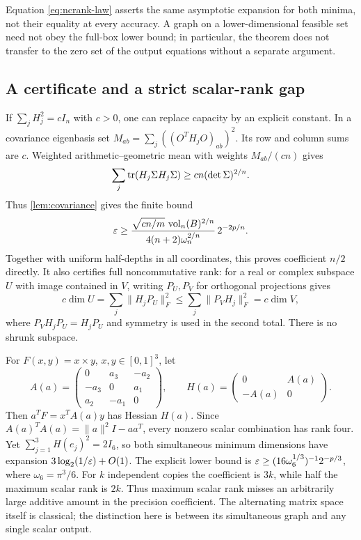 Equation \eqref{eq:ncrank-law} asserts the same asymptotic expansion for
both minima, not their equality at every accuracy. A graph on a
lower-dimensional feasible set need not obey the full-box lower bound;
in particular, the theorem does not transfer to the zero set of the
output equations without a separate argument.

\subsection{A certificate and a strict scalar-rank gap}

If $\sum_jH_j^2=cI_n$ with $c>0$, one can replace capacity by an explicit
constant. In a covariance eigenbasis set
$M_{ab}=\sum_j((O^TH_jO)_{ab})^2$. Its row and column sums are $c$.
Weighted arithmetic--geometric mean with weights $M_{ab}/(cn)$ gives
\[
 \sum_j\operatorname{tr}(H_j\Sigma H_j\Sigma)
 \ge cn(\det\Sigma)^{2/n}.
\]
Thus \cref{lem:covariance} gives the finite bound
\begin{equation}\label{eq:sos-certificate}
 \varepsilon\ge
 \frac{\sqrt{cn/m}\,\operatorname{vol}_n(B)^{2/n}}
      {4(n+2)\omega_n^{2/n}}\,2^{-2p/n}.
\end{equation}
Together with uniform half-depths in all coordinates, this proves
coefficient $n/2$ directly. It also certifies full noncommutative rank:
for a real or complex subspace $U$ with image contained in $V$, writing
$P_U,P_V$ for orthogonal projections gives
\[
 c\dim U=\sum_j\|H_jP_U\|_F^2
 \le\sum_j\|P_VH_j\|_F^2=c\dim V,
\]
where $P_VH_jP_U=H_jP_U$ and symmetry is used in the second total.
There is no shrunk subspace.

For $F(x,y)=x\times y$, $x,y\in[0,1]^3$, let
\[
 A(a)=\begin{pmatrix}0&a_3&-a_2\\-a_3&0&a_1\\a_2&-a_1&0\end{pmatrix},
 \qquad H(a)=\begin{pmatrix}0&A(a)\\-A(a)&0\end{pmatrix}.
\]
Then $a^TF=x^TA(a)y$ has Hessian $H(a)$.
Since $A(a)^TA(a)=\|a\|^2I-aa^T$, every nonzero scalar combination
has rank four. Yet $\sum_{j=1}^3H(e_j)^2=2I_6$, so both simultaneous
minimum dimensions have expansion $3\log_2(1/\varepsilon)+O(1)$.
The explicit lower bound is
$\varepsilon\ge(16\omega_6^{1/3})^{-1}2^{-p/3}$, where $\omega_6=\pi^3/6$.
For $k$ independent copies the coefficient is $3k$, while half the
maximum scalar rank is $2k$. Thus maximum scalar rank misses an
arbitrarily large additive amount in the precision coefficient.
The alternating matrix space itself is classical; the distinction here
is between its simultaneous graph and any single scalar output.

